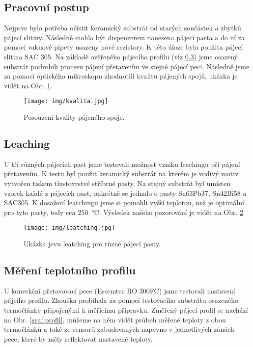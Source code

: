 \subsection{Pracovní postup}
    Nejprve bylo potřeba očistit keramický substrát od starých součástek a zbytků pájecí slitiny. Následně mohla být dispenzerem nanesena pájecí pasta a do ní za pomocí vakuové pipety usazeny nové rezistory. K této úloze byla použita pájecí slitina SAC 305. Na základě ověřeného pájecího profilu (viz \ref{profilek}) jsme osazený substrát podrobili procesu pájení přetavením ve stejné pájecí peci. Následně jsme za pomoci optického mikroskopu zhodnotili kvalitu pájených spojů, ukázka je vidět na Obr. \ref{fig:img-kvalita-jpg}.

    \begin{figure}[h!]
        \centering
        \texttt{[image: img/kvalita.jpg]}
        \caption{Posouzení kvality pájeného spoje.}
        \label{fig:img-kvalita-jpg}
    \end{figure}
    

\subsection{Leaching}
    U tří různých pájecích past jsme testovali možnost vzniku leachingu při pájení přetavením. K testu byl použit keramický substrát na kterém je vodivý motiv vytvořen tiskem tlustovrstvé stříbrné pasty. Na stejný substrát byl umísten vzorek každé z pájecích past, onkrétně se jednalo o pasty Sn63Pb37, Sn42Bi58 a SAC305. K dosažení leatchingu jsme si pomohli vyšší teplotou, než je optimální pro tyto pasty, tedy cca \qty{250}{\degreeCelsius}. Výsledek našeho pozorování je vidět na Obr. \ref{fig:img-leatching-jpg}

    \begin{figure}[h!]
        \centering
        \texttt{[image: img/leatching.jpg]}
        \caption{Ukázka jevu leatching pro různé pájecí pasty.}
        \label{fig:img-leatching-jpg}
    \end{figure}
    



\subsection{Měření teplotního profilu} \label{profilek}
    U konvekční přetavovací pece (Essemtec RO 300FC) jsme testovali nastavení pájcího profilu. Zkouška probíhala za pomocí testovacího substrátu osazeného termočlánky připojenými k měřícímu přípravku. Změřený pájecí profil se nachází na Obr. \ref{graf:profil}, můžeme na něm vidět průbeh měřené teploty z obou termočlánků a také ze sensorů zabudovaných napevno v jednotlivých zónách pece, které by měly reflektovat nastavené teploty.

